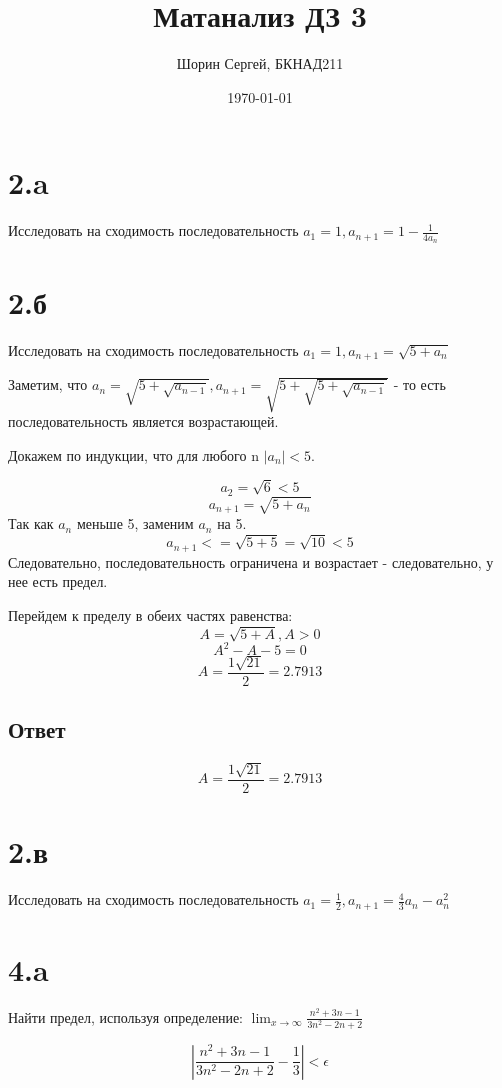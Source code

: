 \documentclass[a4paper]{article}
\author{Шорин Сергей, БКНАД211}
\title{Матанализ ДЗ 3}
\date{\today}
\begin{document}
\maketitle



\section*{2.a}
Исследовать на сходимость последовательность $ a_1 = 1, a_{n+1}  = 1 - \frac{1}{4a_n}$


\section*{2.б}
Исследовать на сходимость последовательность $ a_1 = 1, a_{n+1}  = \sqrt{5 + a_n}$

Заметим, что $a_n = \sqrt{5 + \sqrt{a_{n - 1}}}, a_{n+1} = \sqrt{5 + \sqrt{5 +\sqrt{a_{n - 1}}}}$ - то есть последовательность является возрастающей.

Докажем по индукции, что для любого n $|a_n| < 5$.

$$a_2 = \sqrt{6} < 5$$
$$a_{n + 1} = \sqrt{5 + a_n}$$
Так как $a_n$ меньше 5, заменим $a_n$ на 5.
$$a_{n + 1} <= \sqrt{5 + 5} = \sqrt{10} < 5$$
Следовательно, последовательность ограничена и возрастает - следовательно, у нее есть предел.

Перейдем к пределу в обеих частях равенства:
$$A = \sqrt{5 + A}, A > 0$$
$$A^2 - A - 5 = 0$$
$$A = \frac{1 \sqrt{21}}{2} = 2.7913$$
\subsection*{Ответ}
$$A = \frac{1 \sqrt{21}}{2} = 2.7913$$

\section*{2.в}
Исследовать на сходимость последовательность $ a_1 = \frac{1}{2}, a_{n+1}  = \frac{4}{3}a_n - a^2_n$





\newpage

\section{4.a}
Найти предел, используя определение: 
$\displaystyle{\lim_{x \to \infty}} \frac{n^2 + 3n - 1}{3n^2 - 2n + 2}$

$$|\frac{n^2 + 3n - 1}{3n^2 - 2n + 2} - \frac{1}{3}| < \epsilon $$
\end{document}
